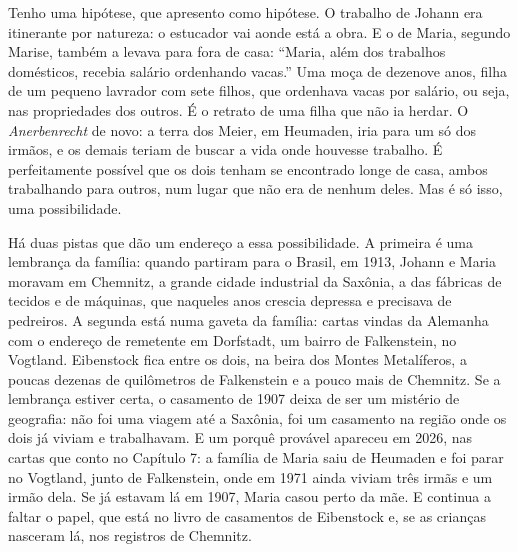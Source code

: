 \documentclass[
  brazilian,
  11pt,
  openany]{book}
\begin{document}
Tenho uma hipótese, que apresento como hipótese. O trabalho de Johann
era itinerante por natureza: o estucador vai aonde está a obra. E o de
Maria, segundo Marise, também a levava para fora de casa: ``Maria, além
dos trabalhos domésticos, recebia salário ordenhando vacas.'' Uma moça
de dezenove anos, filha de um pequeno lavrador com sete filhos, que
ordenhava vacas por salário, ou seja, nas propriedades dos outros. É o
retrato de uma filha que não ia herdar. O \emph{Anerbenrecht} de novo: a
terra dos Meier, em Heumaden, iria para um só dos irmãos, e os demais
teriam de buscar a vida onde houvesse trabalho. É perfeitamente possível
que os dois tenham se encontrado longe de casa, ambos trabalhando para
outros, num lugar que não era de nenhum deles. Mas é só isso, uma
possibilidade.

Há duas pistas que dão um endereço a essa possibilidade. A primeira é
uma lembrança da família: quando partiram para o Brasil, em 1913, Johann
e Maria moravam em Chemnitz, a grande cidade industrial da Saxônia, a
das fábricas de tecidos e de máquinas, que naqueles anos crescia
depressa e precisava de pedreiros. A segunda está numa gaveta da
família: cartas vindas da Alemanha com o endereço de remetente em
Dorfstadt, um bairro de Falkenstein, no Vogtland. Eibenstock fica entre
os dois, na beira dos Montes Metalíferos, a poucas dezenas de
quilômetros de Falkenstein e a pouco mais de Chemnitz. Se a lembrança
estiver certa, o casamento de 1907 deixa de ser um mistério de
geografia: não foi uma viagem até a Saxônia, foi um casamento na região
onde os dois já viviam e trabalhavam. E um porquê provável apareceu em
2026, nas cartas que conto no Capítulo 7: a família de Maria saiu de
Heumaden e foi parar no Vogtland, junto de Falkenstein, onde em 1971
ainda viviam três irmãs e um irmão dela. Se já estavam lá em 1907, Maria
casou perto da mãe. E continua a faltar o papel, que está no livro de
casamentos de Eibenstock e, se as crianças nasceram lá, nos registros de
Chemnitz.
\end{document}
